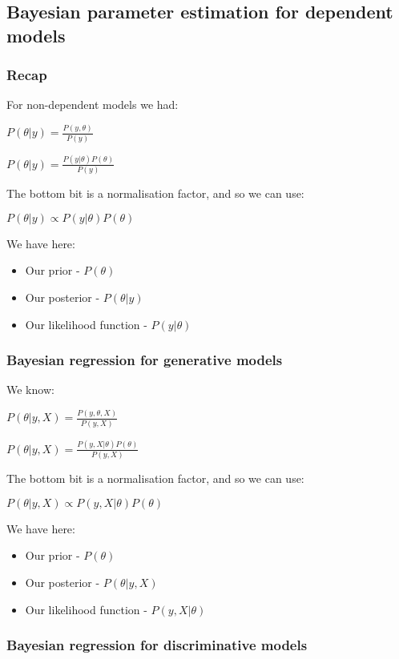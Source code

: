 
\subsection{Bayesian parameter estimation for dependent models}

\subsubsection{Recap}

For non-dependent models we had:

\(P(\theta |y)=\frac{P(y, \theta)}{P(y)}\)

\(P(\theta |y)=\frac{P(y| \theta)P(\theta )}{P(y)}\)

The bottom bit is a normalisation factor, and so we can use:

\(P(\theta |y)\propto P(y| \theta)P(\theta )\)

We have here:

\begin{itemize}
\item Our prior - \(P(\theta )\)
\item Our posterior - \(P(\theta |y)\)
\item Our likelihood function - \(P(y| \theta)\)
\end{itemize}

\subsubsection{Bayesian regression for generative models}

We know:

\(P(\theta |y,X)=\frac{P(y, \theta, X )}{P(y, X)}\)

\(P(\theta |y,X)=\frac{P(y, X |\theta )P(\theta )}{P(y, X)}\)

The bottom bit is a normalisation factor, and so we can use:

\(P(\theta |y,X)\propto P(y, X| \theta)P(\theta)\)

We have here:

\begin{itemize}
\item Our prior - \(P(\theta )\)
\item Our posterior - \(P(\theta |y,X)\)
\item Our likelihood function - \(P(y, X| \theta )\)
\end{itemize}

\subsubsection{Bayesian regression for discriminative models}

